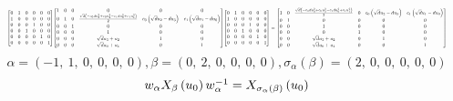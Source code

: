 \documentclass[11pt]{article}
\theoremstyle{definition}
\begin{document}
\[
\scaletoalign{\textwidth}{{\left[\begin{matrix}0 & 1 & 0 & 0 & 0 & 0\\1 & 0 & 0 & 0 & 0 & 0\\0 & 0 & 0 & 1 & 0 & 0\\0 & 0 & 1 & 0 & 0 & 0\\0 & 0 & 0 & 0 & 1 & 0\\0 & 0 & 0 & 0 & 0 & 1\end{matrix}\right]} {\left[\begin{matrix}1 & 0 & 0 & 0 & 0 & 0\\0 & 1 & 0 & \frac{\sqrt{d} \left(- c_{0} d u_{3}^{2} + c_{0} u_{2}^{2} - c_{1} d u_{0}^{2} + c_{1} u_{1}^{2}\right)}{2} & c_{0} \left(\sqrt{d} u_{2} - d u_{3}\right) & c_{1} \left(\sqrt{d} u_{1} - d u_{0}\right)\\0 & 0 & 1 & 0 & 0 & 0\\0 & 0 & 0 & 1 & 0 & 0\\0 & 0 & 0 & \sqrt{d} u_{3} + u_{2} & 1 & 0\\0 & 0 & 0 & \sqrt{d} u_{0} + u_{1} & 0 & 1\end{matrix}\right]} {\left[\begin{matrix}0 & 1 & 0 & 0 & 0 & 0\\1 & 0 & 0 & 0 & 0 & 0\\0 & 0 & 0 & 1 & 0 & 0\\0 & 0 & 1 & 0 & 0 & 0\\0 & 0 & 0 & 0 & 1 & 0\\0 & 0 & 0 & 0 & 0 & 1\end{matrix}\right]} = {\left[\begin{matrix}1 & 0 & \frac{\sqrt{d} \left(- c_{0} d u_{3}^{2} + c_{0} u_{2}^{2} - c_{1} d u_{0}^{2} + c_{1} u_{1}^{2}\right)}{2} & 0 & c_{0} \left(\sqrt{d} u_{2} - d u_{3}\right) & c_{1} \left(\sqrt{d} u_{1} - d u_{0}\right)\\0 & 1 & 0 & 0 & 0 & 0\\0 & 0 & 1 & 0 & 0 & 0\\0 & 0 & 0 & 1 & 0 & 0\\0 & 0 & \sqrt{d} u_{3} + u_{2} & 0 & 1 & 0\\0 & 0 & \sqrt{d} u_{0} + u_{1} & 0 & 0 & 1\end{matrix}\right]}}
\]
\[
\alpha = \left( -1, \  1, \  0, \  0, \  0, \  0\right), \beta = \left( 0, \  2, \  0, \  0, \  0, \  0\right), \sigma_{\alpha}(\beta) = \left( 2, \  0, \  0, \  0, \  0, \  0\right)
\]
\[
\scaletoalign{\textwidth}{w_{\alpha} X_{\beta}\left(u_{0}\right) w_{\alpha}^{-1} = X_{\sigma_{\alpha}\left(\beta\right)}\left(u_{0}\right)}
\]
\end{document}
